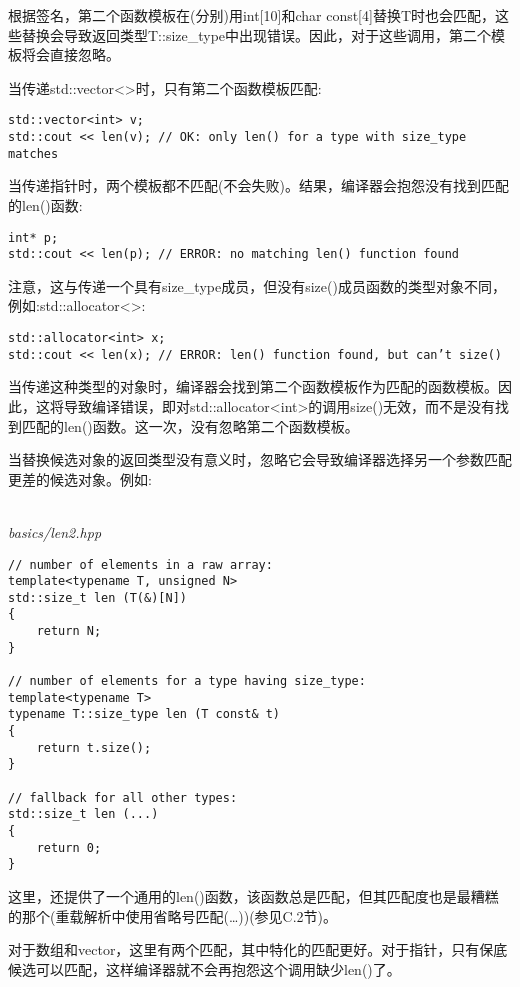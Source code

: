 根据签名，第二个函数模板在(分别)用int[10]和char const[4]替换T时也会匹配，这些替换会导致返回类型T::size\_type中出现错误。因此，对于这些调用，第二个模板将会直接忽略。

当传递std::vector<>时，只有第二个函数模板匹配:

\begin{lstlisting}[style=styleCXX]
std::vector<int> v;
std::cout << len(v); // OK: only len() for a type with size_type matches
\end{lstlisting}

当传递指针时，两个模板都不匹配(不会失败)。结果，编译器会抱怨没有找到匹配的len()函数:

\begin{lstlisting}[style=styleCXX]
int* p;
std::cout << len(p); // ERROR: no matching len() function found
\end{lstlisting}

注意，这与传递一个具有size\_type成员，但没有size()成员函数的类型对象不同，例如:std::allocator<>:

\begin{lstlisting}[style=styleCXX]
std::allocator<int> x;
std::cout << len(x); // ERROR: len() function found, but can’t size()
\end{lstlisting}

当传递这种类型的对象时，编译器会找到第二个函数模板作为匹配的函数模板。因此，这将导致编译错误，即对std::allocator<int>的调用size()无效，而不是没有找到匹配的len()函数。这一次，没有忽略第二个函数模板。

当替换候选对象的返回类型没有意义时，忽略它会导致编译器选择另一个参数匹配更差的候选对象。例如:

\hspace*{\fill} \\ %
\noindent
\textit{basics/len2.hpp}
\begin{lstlisting}[style=styleCXX]
// number of elements in a raw array:
template<typename T, unsigned N>
std::size_t len (T(&)[N])
{
	return N;
}

// number of elements for a type having size_type:
template<typename T>
typename T::size_type len (T const& t)
{
	return t.size();
}

// fallback for all other types:
std::size_t len (...)
{
	return 0;
}
\end{lstlisting}

这里，还提供了一个通用的len()函数，该函数总是匹配，但其匹配度也是最糟糕的那个(重载解析中使用省略号匹配(…))(参见C.2节)。

对于数组和vector，这里有两个匹配，其中特化的匹配更好。对于指针，只有保底候选可以匹配，这样编译器就不会再抱怨这个调用缺少len()了。

